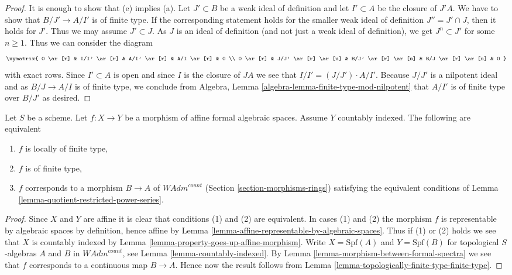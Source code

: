 \begin{proof}
It is enough to show that (e) implies (a). Let $J' \subset B$ be a weak ideal
of definition and let $I' \subset A$ be the closure of $J'A$. We have
to show that $B/J' \to A/I'$ is of finite type. If the corresponding statement
holds for the smaller weak ideal of definition $J'' = J' \cap J$, then it
holds for $J'$. Thus we may assume $J' \subset J$. As $J$ is an ideal
of definition (and not just a weak ideal of definition), we get
$J^n \subset J'$ for some $n \geq 1$. Thus we can consider the
diagram
$$
\xymatrix{
0 \ar[r] & I/I' \ar[r] & A/I' \ar[r] & A/I \ar[r] & 0 \\
0 \ar[r] & J/J' \ar[r] \ar[u] & B/J' \ar[r] \ar[u] & B/J \ar[r] \ar[u] & 0
}
$$
with exact rows. Since $I' \subset A$ is open and since
$I$ is the closure of $J A$ we see that $I/I' = (J/J') \cdot A/I'$.
Because $J/J'$ is a nilpotent ideal and as $B/J \to A/I$ is of finite type,
we conclude from Algebra, Lemma \ref{algebra-lemma-finite-type-mod-nilpotent}
that $A/I'$ is of finite type over $B/J'$ as desired.
\end{proof}

\begin{lemma}
\label{lemma-representable-affine-finite-type}
Let $S$ be a scheme. Let $f : X \to Y$ be a morphism of
affine formal algebraic spaces. Assume $Y$ countably indexed.
The following are equivalent
\begin{enumerate}
\item $f$ is locally of finite type,
\item $f$ is of finite type,
\item $f$ corresponds to a morphism $B \to A$ of $\textit{WAdm}^{count}$
(Section \ref{section-morphisms-rings})
satisfying the equivalent conditions of
Lemma \ref{lemma-quotient-restricted-power-series}.
\end{enumerate}
\end{lemma}

\begin{proof}
Since $X$ and $Y$ are affine it is clear that conditions (1)
and (2) are equivalent. In cases (1) and (2) the morphism $f$
is representable by algebraic spaces by definition, hence
affine by Lemma \ref{lemma-affine-representable-by-algebraic-spaces}.
Thus if (1) or (2) holds we see that
$X$ is countably indexed by
Lemma \ref{lemma-property-goes-up-affine-morphism}.
Write $X = \text{Spf}(A)$ and $Y = \text{Spf}(B)$
for topological $S$-algebras $A$ and $B$ in $\textit{WAdm}^{count}$, see
Lemma \ref{lemma-countably-indexed}. By
Lemma \ref{lemma-morphism-between-formal-spectra}
we see that $f$ corresponds to a continuous map $B \to A$.
Hence now the result follows from
Lemma \ref{lemma-topologically-finite-type-finite-type}.
\end{proof}

